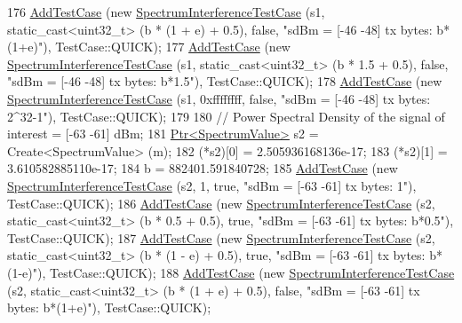 \begin{DoxyCode}
176   \hyperlink{classns3_1_1TestCase_a3718088e3eefd5d6454569d2e0ddd835}{AddTestCase} (\textcolor{keyword}{new} \hyperlink{classSpectrumInterferenceTestCase}{SpectrumInterferenceTestCase} (s1, 
      static\_cast<uint32\_t> (b * (1 + e) + 0.5), \textcolor{keyword}{false}, \textcolor{stringliteral}{"sdBm  = [-46 -48]  tx bytes: b*(1+e)"}), TestCase::QUICK);
177   \hyperlink{classns3_1_1TestCase_a3718088e3eefd5d6454569d2e0ddd835}{AddTestCase} (\textcolor{keyword}{new} \hyperlink{classSpectrumInterferenceTestCase}{SpectrumInterferenceTestCase} (s1, 
      static\_cast<uint32\_t> (b * 1.5 + 0.5), \textcolor{keyword}{false},   \textcolor{stringliteral}{"sdBm  = [-46 -48]  tx bytes: b*1.5"}), TestCase::QUICK);
178   \hyperlink{classns3_1_1TestCase_a3718088e3eefd5d6454569d2e0ddd835}{AddTestCase} (\textcolor{keyword}{new} \hyperlink{classSpectrumInterferenceTestCase}{SpectrumInterferenceTestCase} (s1, 0xffffffff, \textcolor{keyword}{
      false},     \textcolor{stringliteral}{"sdBm  = [-46 -48]  tx bytes: 2^32-1"}), TestCase::QUICK);
179 
180   \textcolor{comment}{// Power Spectral Density of the signal of interest  =  [-63 -61] dBm;}
181   \hyperlink{classns3_1_1Ptr}{Ptr<SpectrumValue>} s2  = Create<SpectrumValue> (m);
182   (*s2)[0] = 2.505936168136e-17;
183   (*s2)[1] = 3.610582885110e-17;
184   b = 882401.591840728;
185   \hyperlink{classns3_1_1TestCase_a3718088e3eefd5d6454569d2e0ddd835}{AddTestCase} (\textcolor{keyword}{new} \hyperlink{classSpectrumInterferenceTestCase}{SpectrumInterferenceTestCase} (s2,   1, \textcolor{keyword}{true},     
             \textcolor{stringliteral}{"sdBm  = [-63 -61]  tx bytes: 1"}), TestCase::QUICK);
186   \hyperlink{classns3_1_1TestCase_a3718088e3eefd5d6454569d2e0ddd835}{AddTestCase} (\textcolor{keyword}{new} \hyperlink{classSpectrumInterferenceTestCase}{SpectrumInterferenceTestCase} (s2, 
      static\_cast<uint32\_t> (b * 0.5 + 0.5), \textcolor{keyword}{true},   \textcolor{stringliteral}{"sdBm  = [-63 -61]  tx bytes: b*0.5"}), TestCase::QUICK);
187   \hyperlink{classns3_1_1TestCase_a3718088e3eefd5d6454569d2e0ddd835}{AddTestCase} (\textcolor{keyword}{new} \hyperlink{classSpectrumInterferenceTestCase}{SpectrumInterferenceTestCase} (s2, 
      static\_cast<uint32\_t> (b * (1 - e) + 0.5), \textcolor{keyword}{true}, \textcolor{stringliteral}{"sdBm  = [-63 -61]  tx bytes: b*(1-e)"}), TestCase::QUICK);
188   \hyperlink{classns3_1_1TestCase_a3718088e3eefd5d6454569d2e0ddd835}{AddTestCase} (\textcolor{keyword}{new} \hyperlink{classSpectrumInterferenceTestCase}{SpectrumInterferenceTestCase} (s2, 
      static\_cast<uint32\_t> (b * (1 + e) + 0.5), \textcolor{keyword}{false}, \textcolor{stringliteral}{"sdBm  = [-63 -61]  tx bytes: b*(1+e)"}), TestCase::QUICK);

\end{DoxyCode}
